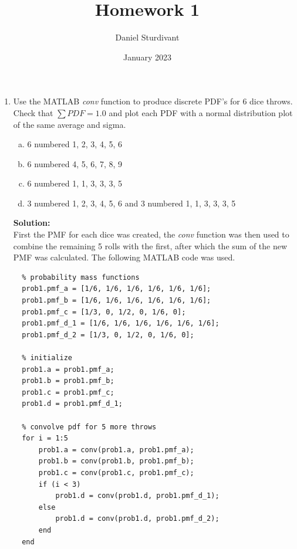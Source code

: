\documentclass[11pt]{article}
\author{Daniel Sturdivant}
\title{Homework 1}
\date{January 2023}
\newcommand{\solution}{\textbf{Solution: \\}}
\begin{document}
\maketitle
\thispagestyle{fancy}
\setlength{\parindent}{0pt}

\begin{enumerate}[label=\textbf{\arabic*.}]
  \itemsep 24pt
  \item Use the MATLAB \emph{conv} function to produce discrete PDF's for 6 
  dice throws. Check that $\sum PDF = 1.0$ and plot each PDF with a normal 
  distribution plot of the same average and sigma.
  \begin{enumerate}[(a)]
    \itemsep -2pt
    \item 6 numbered 1, 2, 3, 4, 5, 6
    \item 6 numbered 4, 5, 6, 7, 8, 9
    \item 6 numbered 1, 1, 3, 3, 3, 5
    \item 3 numbered 1, 2, 3, 4, 5, 6 and 3 numbered 1, 1, 3, 3, 3, 5
  \end{enumerate}
  \solution
  First the PMF for each dice was created, the \emph{conv} function was then 
  used to combine the remaining 5 rolls with the first, after which the sum 
  of the new PMF was calculated. The following MATLAB code was used.
  \begin{lstlisting}
  % probability mass functions
  prob1.pmf_a = [1/6, 1/6, 1/6, 1/6, 1/6, 1/6];
  prob1.pmf_b = [1/6, 1/6, 1/6, 1/6, 1/6, 1/6];
  prob1.pmf_c = [1/3, 0, 1/2, 0, 1/6, 0];
  prob1.pmf_d_1 = [1/6, 1/6, 1/6, 1/6, 1/6, 1/6];
  prob1.pmf_d_2 = [1/3, 0, 1/2, 0, 1/6, 0];

  % initialize
  prob1.a = prob1.pmf_a;
  prob1.b = prob1.pmf_b;
  prob1.c = prob1.pmf_c;
  prob1.d = prob1.pmf_d_1;

  % convolve pdf for 5 more throws
  for i = 1:5
      prob1.a = conv(prob1.a, prob1.pmf_a);
      prob1.b = conv(prob1.b, prob1.pmf_b);
      prob1.c = conv(prob1.c, prob1.pmf_c);
      if (i < 3)
          prob1.d = conv(prob1.d, prob1.pmf_d_1);
      else
          prob1.d = conv(prob1.d, prob1.pmf_d_2);
      end
  end


\end{lstlisting}
\end{enumerate}
\end{document}
